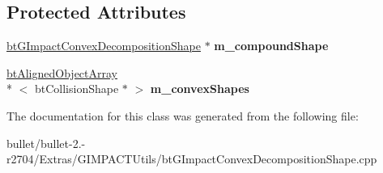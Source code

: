 \subsection*{Protected Attributes}
\begin{DoxyCompactItemize}
\item 
\hypertarget{class_g_i_m___convex_decomposition_a347459c5b21e48a220451a22a09e03e5}{\hyperlink{classbt_g_impact_convex_decomposition_shape}{bt\+G\+Impact\+Convex\+Decomposition\+Shape} $\ast$ {\bfseries m\+\_\+compound\+Shape}}\label{class_g_i_m___convex_decomposition_a347459c5b21e48a220451a22a09e03e5}

\item 
\hypertarget{class_g_i_m___convex_decomposition_ad2866af78d758a4aa0a440570cd4277b}{\hyperlink{classbt_aligned_object_array}{bt\+Aligned\+Object\+Array}\\*
$<$ bt\+Collision\+Shape $\ast$ $>$ {\bfseries m\+\_\+convex\+Shapes}}\label{class_g_i_m___convex_decomposition_ad2866af78d758a4aa0a440570cd4277b}

\end{DoxyCompactItemize}


The documentation for this class was generated from the following file\+:\begin{DoxyCompactItemize}
\item 
bullet/bullet-\/2.-\/r2704/\+Extras/\+G\+I\+M\+P\+A\+C\+T\+Utils/bt\+G\+Impact\+Convex\+Decomposition\+Shape.\+cpp\end{DoxyCompactItemize}
